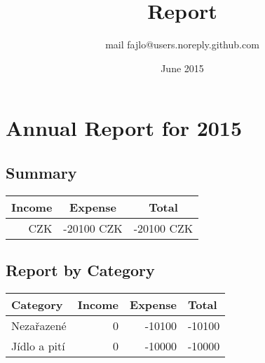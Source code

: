 \documentclass{article}
\title{Report}
\author{mail fajlo@users.noreply.github.com}
\date{June 2015}
\begin{document}
        \section*{Annual Report for 2015}

        \subsection*{Summary}
        \begin{center}
        \begin{tabular}{ | r | r | r | }
        \hline               

        \multicolumn{1}{|c|}{\bfseries Income} &
        \multicolumn{1}{|c|}{\bfseries Expense} &
        \multicolumn{1}{|c|}{\bfseries Total} \\
        \hline
        
         CZK &
        -20100 CZK &
        -20100 CZK \\

        \hline  
        \end{tabular}
        \end{center}

        \subsection*{Report by Category}
        \begin{tabular}{ | l | l | l | l | }
        \hline               

        \bfseries Category &
        \bfseries Income &
        \bfseries Expense &
        \bfseries Total \\
        \hline

        Nezařazené &
            \multicolumn{1}{|r|}{0} &
            \multicolumn{1}{|r|}{-10100} &
            \multicolumn{1}{|r|}{-10100} \\
            \hline 
        Jídlo a pití &
            \multicolumn{1}{|r|}{0} &
            \multicolumn{1}{|r|}{-10000} &
            \multicolumn{1}{|r|}{-10000} \\
            \hline 
        
        
        \hline  
        \end{tabular}
        
\end{document}
